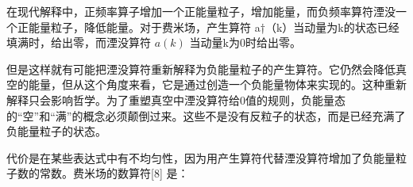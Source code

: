 在现代解释中，正频率算子增加一个正能量粒子，增加能量，而负频率算符湮没一个正能量粒子，降低能量。对于费米场，产生算符 a†（k）当动量为k的状态已经填满时，给出零，而湮没算符 $a(k)$ 当动量k为0时给出零。

但是这样就有可能把湮没算符重新解释为负能量粒子的产生算符。它仍然会降低真空的能量，但从这个角度来看，它是通过创造一个负能量物体来实现的。这种重新解释只会影响哲学。为了重塑真空中湮没算符给0值的规则，负能量态的“空”和“满”的概念必须颠倒过来。这些不是没有反粒子的状态，而是已经充满了负能量粒子的状态。

代价是在某些表达式中有不均匀性，因为用产生算符代替湮没算符增加了负能量粒子数的常数。费米场的数算符[8] 是：